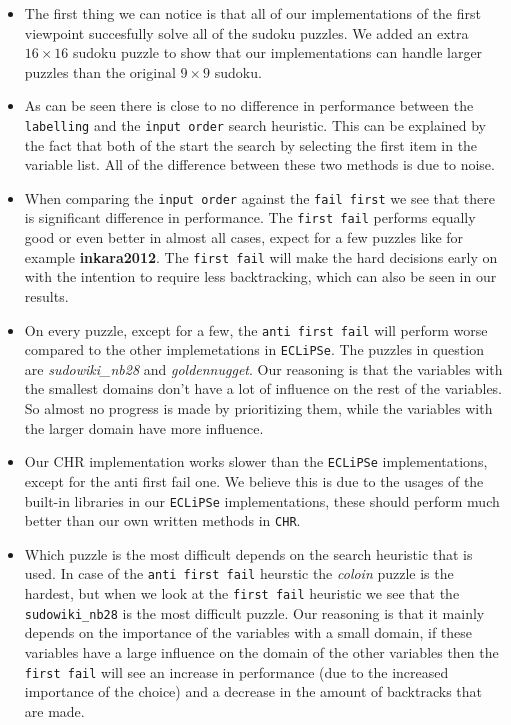 \begin{itemize} %
\item The first thing we can notice is that all of our implementations of the first viewpoint succesfully solve all of the sudoku puzzles. We added an extra $16 \times 16$ sudoku puzzle to show that our implementations can handle larger puzzles than the original $9 \times 9$ sudoku.
\item As can be seen there is close to no difference in performance between the \texttt{labelling} and the \texttt{input order} search heuristic. This can be explained by the fact that both of the start the search by selecting the first item in the variable list. All of the difference between these two methods is due to noise.
\item When comparing the \texttt{input order} against the \texttt{fail first} we see that there is significant difference in performance. The \texttt{first fail} performs equally good or even better in almost all cases, expect for a few puzzles like for example \textbf{inkara2012}. The \texttt{first fail} will make the hard decisions early on with the intention to require less backtracking, which can also be seen in our results.
\item On every puzzle, except for a few, the \texttt{anti first fail} will perform worse compared to the other implemetations in \texttt{ECLiPSe}. The puzzles in question are \textit{sudowiki\_nb28} and \textit{goldennugget}. Our reasoning is that the variables with the smallest domains don't have a lot of influence on the rest of the variables. So almost no progress is made by prioritizing them, while the variables with the larger domain have more influence.
\item Our CHR implementation works slower than the \texttt{ECLiPSe} implementations, except for the anti first fail one. We believe this is due to the usages of the built-in libraries in our \texttt{ECLiPSe} implementations, these should perform much better than our own written methods in \texttt{CHR}.
\item Which puzzle is the most difficult depends on the search heuristic that is used. In case of the \texttt{anti first fail} heurstic the \textit{coloin} puzzle is the hardest, but when we look at the \texttt{first fail} heuristic we see that the \texttt{sudowiki\_nb28} is the most difficult puzzle. Our reasoning is that it mainly depends on the importance of the variables with a small domain, if these variables have a large influence on the domain of the other variables then the \texttt{first fail} will see an increase in performance (due to the increased importance of the choice) and a decrease in the amount of backtracks that are made. 
\end{itemize}


